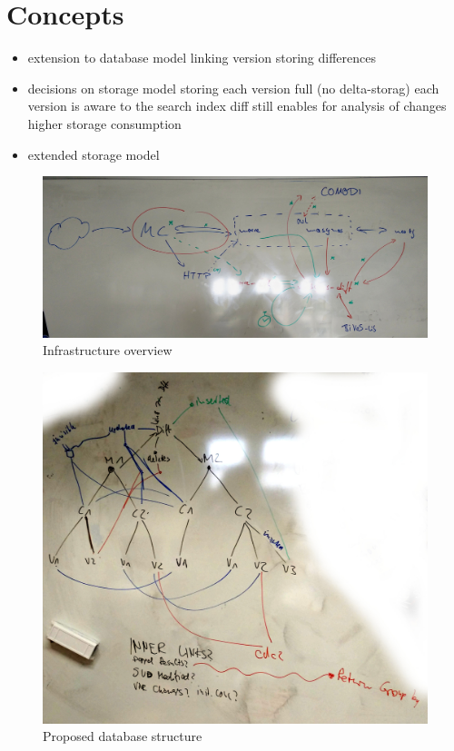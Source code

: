\section{Concepts}

\begin{itemize}
\item extension to database model
	\subitem linking version
	\subitem storing differences
\item decisions on storage model
	\subitem storing each version full (no delta-storag)
	\subitem each version is aware to the search index
	\subitem diff still enables for analysis of changes
	\subitem higher storage consumption
\item extended storage model
\end{itemize}

\begin{figure}
	\includegraphics[width=\textwidth]{resources/system_overview.jpg}
	\caption{Infrastructure overview }
	\label{fig:system-overview}
\end{figure}

\begin{figure}
	\includegraphics[width=\textwidth]{resources/db_structure.jpg}
	\caption{Proposed database structure}
	\label{fig:db-model}
\end{figure}
